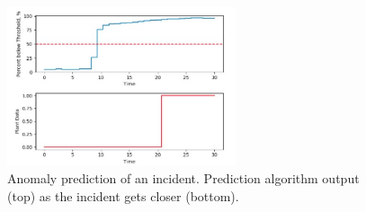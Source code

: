 \begin{figure}[H]
    \centering
    \includegraphics[width=0.6\textwidth]{images/ch3/an_pred.jpg}
    \caption{Anomaly prediction of an incident. Prediction algorithm output (top) as the incident gets closer (bottom).}
    \label{fig:03anomaly_prediction}
\end{figure}





















